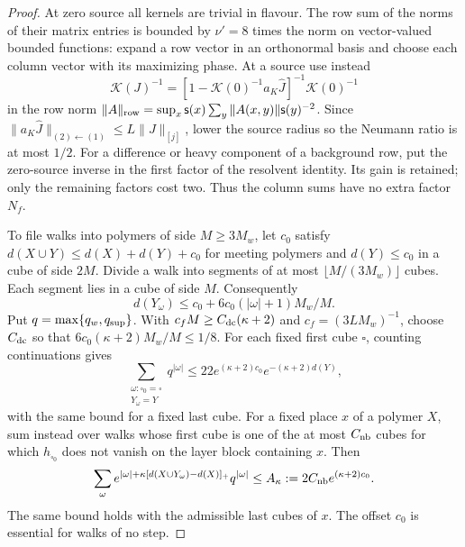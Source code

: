 \documentclass[11pt,letterpaper,reqno]{amsart}
\theoremstyle{definition}
\theoremstyle{remark}
\begin{document}
\begin{proof}
At zero source all kernels are trivial in flavour.  The row sum
of the norms of their matrix entries is bounded by $\nu'=8$
times the norm on vector-valued bounded functions: expand a row
vector in an orthonormal basis and choose each column vector
with its maximizing phase.  At a source use instead
\[
 \mathcal K(J)^{-1}=
 [1-\mathcal K(0)^{-1}a_K\hat J]^{-1}\mathcal K(0)^{-1}
\]
in the row norm
$\|A\|_{\rm row}=\sup_x\mathsf s(x)
\sum_y\|A(x,y)\|\mathsf s(y)^{-2}$.
Since $\|a_K\hat J\|_{(2)\leftarrow(1)}\le L\|J\|_{[j]}$,
lower the source radius so the Neumann ratio is at most $1/2$.
For a difference or heavy component of a background row, put the
zero-source inverse in the first factor of the resolvent identity.
Its gain is retained; only the remaining factors cost two.  Thus
the column sums have no extra factor $N_f$.

To file walks into polymers of side $M\ge3M_w$, let $c_0$ satisfy
$d(X\cup Y)\le d(X)+d(Y)+c_0$ for meeting polymers and
$d(Y)\le c_0$ in a cube of side $2M$.  Divide a walk into
segments of at most $\lfloor M/(3M_w)\rfloor$ cubes.  Each
segment lies in a cube of side $M$.  Consequently
\[
 d(Y_\omega)\le c_0+6c_0(|\omega|+1)M_w/M.
\]
Put $q=\max\{q_w,q_{\rm sup}\}$. With $c_fM\ge C_{\rm dc}(\kappa+2)$ and
$c_f=(3LM_w)^{-1}$, choose $C_{\rm dc}$ so that
$6c_0(\kappa+2)M_w/M\le1/8$. For each fixed first cube
$\square$, counting continuations gives
\[
 \sum_{\substack{\omega:\square_0=\square\\Y_\omega=Y}}q^{|\omega|}
 \le22e^{(\kappa+2)c_0}e^{-(\kappa+2)d(Y)},
\]
with the same bound for a fixed last cube. For a fixed place
$x$ of a polymer $X$, sum instead over walks whose first cube
is one of the at most $C_{\rm nb}$ cubes for which
$h_{\square_0}$ does not vanish on the layer block containing
$x$. Then
\[
 \sum_\omega e^{|\omega|+\kappa[d(X\cup Y_\omega)-d(X)]_+}
                 q^{|\omega|}
 \le A_\kappa:=2C_{\rm nb}e^{(\kappa+2)c_0}.
\]
The same bound holds with the admissible last cubes of $x$.
The offset $c_0$ is essential for walks of no step.


\end{proof}
\end{document}
